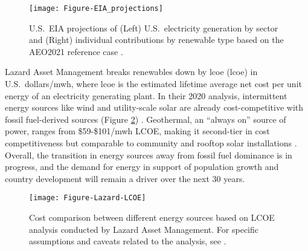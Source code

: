 \begin{figure}[htp]
\centering
\texttt{[image: Figure-EIA\_projections]}
\caption[U.S.\ EIA projections based on the AEO2021 reference case]{U.S.\ EIA projections of (Left) U.S.\ electricity generation by sector and (Right) individual contributions by renewable type based on the AEO2021 reference case \protect\citep{us_energy_information_administration_annual_2021}.}
\label{fig:eia_2021_projections}
\end{figure}

Lazard Asset Management breaks renewables down by \acrlong{lcoe} (\acrshort{lcoe}) in U.S.\ dollars/\acrshort{mwh}, where \acrshort{lcoe} is the estimated lifetime average net cost per unit energy of an electricity generating plant. In their 2020 analysis, intermittent energy sources like wind and utility-scale solar are already cost-competitive with fossil fuel-derived sources (Figure \ref{fig:lazard_lcoe}) \citep{lazard_lazards_2020}. Geothermal, an “always on” source of power, ranges from \$59-\$101/\acrshort{mwh} LCOE, making it second-tier in cost competitiveness but comparable to community and rooftop solar installations \citep{lazard_lazards_2020}. Overall, the transition in energy sources away from fossil fuel dominance is in progress, and the demand for energy in support of population growth and country development will remain a driver over the next 30 years.
 
\begin{figure}[htp]
\centering
\texttt{[image: Figure-Lazard-LCOE]}
\caption[Lazard Levelized Cost of Energy 2020 projections]{Cost comparison between different energy sources based on LCOE analysis conducted by Lazard Asset Management. For specific assumptions and caveats related to the analysis, see \protect\citet{lazard_lazards_2020}.}
\label{fig:lazard_lcoe}
\end{figure}

